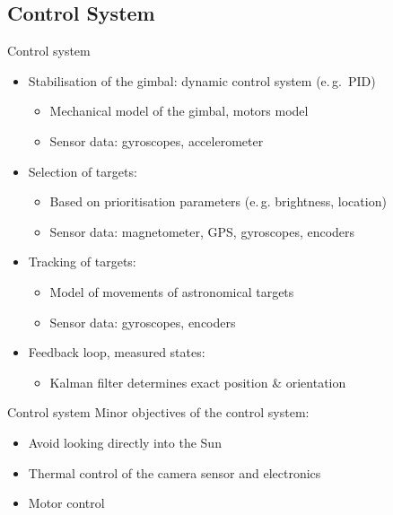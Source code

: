 \documentclass[11pt, aspectratio=169]{beamer}
\begin{document}
\subsection{Control System} 	%
\begin{frame}[t]{Control system}
\begin{itemize}
	\item<1-> Stabilisation of the gimbal: dynamic control system (e.\,g.~PID) %
	\begin{itemize}
		\item Mechanical model of the gimbal, motors model
		\item Sensor data: gyroscopes, accelerometer%
	\end{itemize}
	\item<2-> Selection of targets: %
	\begin{itemize}
		\item Based on prioritisation parameters (e.\,g. brightness, location)
		\item Sensor data: magnetometer, GPS, gyroscopes, encoders %
	\end{itemize}
	\item<3-> Tracking of targets: 
	\begin{itemize}
		\item Model of movements of astronomical targets
		\item Sensor data: gyroscopes, encoders
	\end{itemize}
	\item<4-> Feedback loop, measured states: 
	\begin{itemize}
		\item Kalman filter determines exact position \& orientation
	\end{itemize}
\end{itemize}

\end{frame}

\begin{frame}[t]{Control system}
Minor objectives of the control system:
\begin{itemize}
	\item Avoid looking directly into the Sun
	\item Thermal control of the camera sensor and electronics
	\item Motor control
\end{itemize}

\end{frame}
\end{document}
